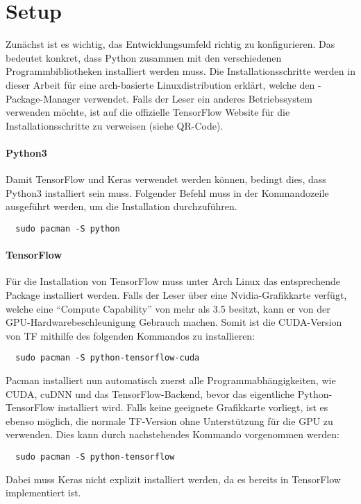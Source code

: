\section{Setup}
Zunächst ist es wichtig, das Entwicklungsumfeld richtig zu konfigurieren. Das
bedeutet konkret, dass Python zusammen mit den verschiedenen Programmbibliotheken
installiert werden muss.
Die Installationsschritte werden in dieser Arbeit für eine arch-basierte
Linuxdistribution erklärt, welche den -Package-Manager verwendet.
Falls der Leser ein anderes Betriebssystem verwenden möchte, ist auf die offizielle
TensorFlow Website für die Installationsschritte zu verweisen (siehe QR-Code).
\para{}
\begin{minipage}{4cm}
  \centering
\end{minipage}

\paragraph{Python3}
Damit TensorFlow und Keras verwendet werden können, bedingt dies, dass Python3
installiert sein muss.
Folgender Befehl muss in der Kommandozeile ausgeführt werden, um die
Installation durchzuführen.
\begin{verbatim}
  sudo pacman -S python
\end{verbatim}

\paragraph{TensorFlow}
Für die Installation von TensorFlow muss unter Arch Linux das entsprechende
Package installiert werden.
Falls der Leser über eine Nvidia-Grafikkarte verfügt, welche eine ``Compute
Capability'' von mehr als 3.5 besitzt, kann er von der
GPU-Hardwarebeschleunigung Gebrauch machen.
Somit ist die CUDA-Version von TF mithilfe des folgenden Kommandos zu installieren:
\begin{verbatim}
  sudo pacman -S python-tensorflow-cuda
\end{verbatim}
Pacman installiert nun automatisch zuerst alle Programmabhängigkeiten, wie
CUDA, cuDNN und das TensorFlow-Backend, bevor das eigentliche
Python-TensorFlow installiert wird.
\para{}
Falls keine geeignete Grafikkarte vorliegt, ist es ebenso möglich, die normale
TF-Version ohne Unterstützung für die GPU zu verwenden.
Dies kann durch nachstehendes Kommando vorgenommen werden:
\begin{verbatim}
  sudo pacman -S python-tensorflow
\end{verbatim}
\para{}
Dabei muss Keras nicht explizit installiert werden, da es bereits in TensorFlow implementiert ist.

